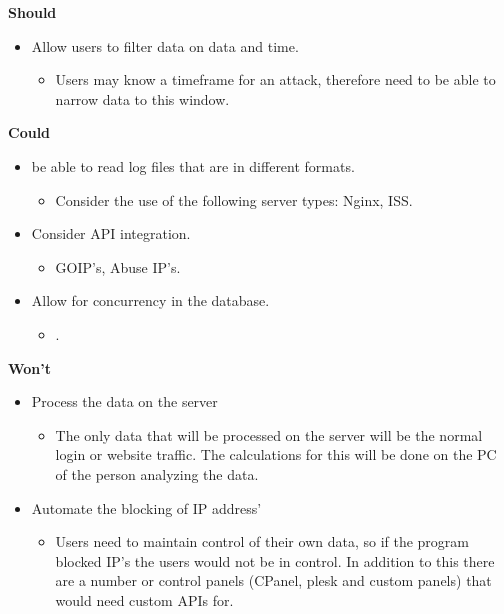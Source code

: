 \textbf{Should}
\begin{itemize}
    \item Allow users to filter data on data and time.
    \begin{itemize}
        \item Users may know a timeframe for an attack, therefore need to be able to narrow data to this window.
    \end{itemize}
\end{itemize}
\textbf{Could}
\begin{itemize}
\item be able to read log files that are in different formats.
    \begin{itemize}
        \item Consider the use of the following server types: Nginx, ISS.
    \end{itemize}
    \item Consider API integration.
    \begin{itemize}
        \item GOIP's, Abuse IP's.
    \end{itemize}
    \item Allow for concurrency in the database.
    \begin{itemize}
        \item .
    \end{itemize}
    
    \end{itemize}
\textbf{Won't}
\begin{itemize}
    \item Process the data on the server
    \begin{itemize}
        \item The only data that will be processed on the server will be the normal login or website traffic. The calculations for this will be done on the PC of the person analyzing the data.
    \end{itemize}
    \item Automate the blocking of IP address' 
    \begin{itemize}
        \item Users need to maintain control of their own data, so if the program blocked IP's the users would not be in control. In addition to this there are a number or control panels (CPanel, plesk and custom panels) that would need custom APIs for.
    \end{itemize}
\end{itemize}

